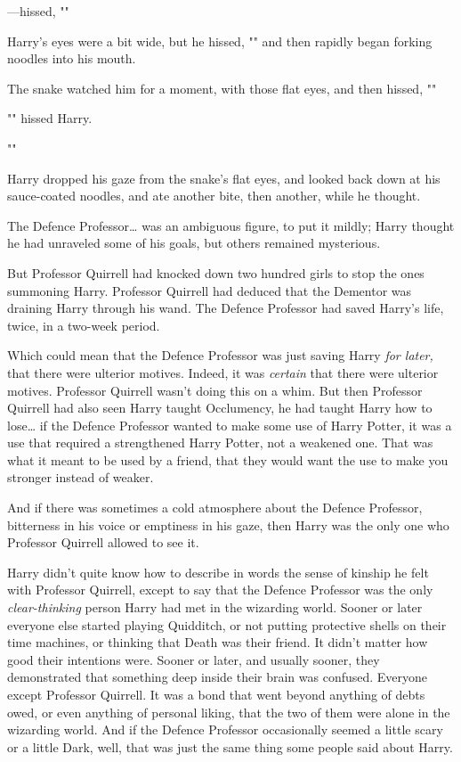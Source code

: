 ---hissed, ""

Harry's eyes were a bit wide, but he hissed, ""
and then rapidly began forking noodles into his mouth.

The snake watched him for a moment, with those flat eyes, and then hissed,
""

"" hissed Harry.

""

Harry dropped his gaze from the snake's flat eyes, and looked back down at his
sauce-coated noodles, and ate another bite, then another, while he thought.

The Defence Professor{\ldots} was an ambiguous figure, to put it mildly; Harry
thought he had unraveled some of his goals, but others remained mysterious.

But Professor Quirrell had knocked down two hundred girls to stop the ones
summoning Harry. Professor Quirrell had deduced that the Dementor was draining
Harry through his wand. The Defence Professor had saved Harry's life, twice, in
a two-week period.

Which could mean that the Defence Professor was just saving Harry \emph{for
later,} that there were ulterior motives. Indeed, it was \emph{certain} that
there were ulterior motives. Professor Quirrell wasn't doing this on a whim.
But then Professor Quirrell had also seen Harry taught Occlumency, he had
taught Harry how to lose{\ldots} if the Defence Professor wanted to make some
use of Harry Potter, it was a use that required a strengthened Harry Potter,
not a weakened one. That was what it meant to be used by a friend, that they
would want the use to make you stronger instead of weaker.

And if there was sometimes a cold atmosphere about the Defence Professor,
bitterness in his voice or emptiness in his gaze, then Harry was the only one
who Professor Quirrell allowed to see it.

Harry didn't quite know how to describe in words the sense of kinship he felt
with Professor Quirrell, except to say that the Defence Professor was the only
\emph{clear-thinking} person Harry had met in the wizarding world. Sooner or
later everyone else started playing Quidditch, or not putting protective shells
on their time machines, or thinking that Death was their friend. It didn't
matter how good their intentions were. Sooner or later, and usually sooner,
they demonstrated that something deep inside their brain was confused. Everyone
except Professor Quirrell. It was a bond that went beyond anything of debts
owed, or even anything of personal liking, that the two of them were alone in
the wizarding world. And if the Defence Professor occasionally seemed a little
scary or a little Dark, well, that was just the same thing some people said
about Harry.

